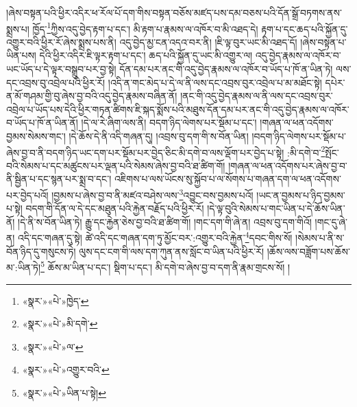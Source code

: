 །ཞེས་བསྟན་པའི་ཕྱིར་འདིར་ཕ་རོལ་པོ་དག་གིས་བསྟན་བཅོས་མཛད་པས་དམ་བཅས་པའི་དོན་སྒྲོ་བཏགས་ནས་སྨྲས་པ། ཁྱོད་\footnote{«སྣར་»«པེ་»ཁྱེད་}ཀྱིས་འདུ་བྱེད་རྟག་པ་དང་། མི་རྟག་པ་རྣམས་ལ་འཁོར་བ་མི་འཐད་དེ། རྟག་པ་དང་ཆད་པའི་སྐྱོན་དུ་འགྱུར་བའི་ཕྱིར་རོ་ཞེས་སྨྲས་པས་ནི། འདུ་བྱེད་མྱ་ངན་འདའ་བར་ནི། །ཇི་ལྟ་བུར་ཡང་མི་འཐད་དོ། །ཞེས་བསྟན་པ་ཡིན་པས། དེའི་ཕྱིར་འདིར་ཇི་ལྟར་རྟག་པ་དང་། ཆད་པའི་སྐྱོན་དུ་ཡང་མི་འགྱུར་ལ། འདུ་བྱེད་རྣམས་ལ་འཁོར་བ་ཡང་ཡོད་པ་དེ་ལྟར་བསྒྲུབ་པར་བྱ་སྟེ། དོན་དམ་པར་ནང་གི་འདུ་བྱེད་རྣམས་ལ་འཁོར་བ་ཡོད་པ་ཁོ་ན་ཡིན་ཏེ། ལས་དང་འབྲས་བུ་འབྲེལ་པའི་ཕྱིར་རོ། །འདི་ན་གང་མེད་པ་དེ་ལ་ནི་ལས་དང་འབྲས་བུར་འབྲེལ་པ་མ་མཐོང་སྟེ། དཔེར་ན་མོ་གཤམ་གྱི་བུ་ཞེས་བྱ་བའི་འདུ་བྱེད་རྣམས་བཞིན་ནོ། །ནང་གི་འདུ་བྱེད་རྣམས་ལ་ནི་ལས་དང་འབྲས་བུར་འབྲེལ་པ་ཡོད་པས་དེའི་ཕྱིར་གཏན་ཚིགས་ཇི་སྐད་སྨོས་པའི་མཐུས་དོན་དམ་པར་ནང་གི་འདུ་བྱེད་རྣམས་ལ་འཁོར་བ་ཡོད་པ་ཁོ་ན་ཡིན་ནོ། །དེ་ལ་རེ་ཞིག་ལས་ནི། བདག་ཉིད་ལེགས་པར་སྡོམ་པ་དང་། །གཞན་ལ་ཕན་འདོགས་བྱམས་སེམས་གང་། །དེ་ཆོས་དེ་ནི་འདི་གཞན་དུ། །འབྲས་བུ་དག་གི་ས་བོན་ཡིན། །བདག་ཉིད་ལེགས་པར་སྡོམ་པ་ཞེས་བྱ་བ་ནི་བདག་ཉིད་ཡང་དག་པར་སྡོམ་པར་བྱེད་ཅིང་མི་དགེ་བ་ལས་ལྡོག་པར་བྱེད་པ་སྟེ། :མི་དགེ་བ་\footnote{«སྣར་»«པེ་»མི་དགེ་}སྤོང་བའི་སེམས་པ་དང་མཚུངས་པར་ལྡན་པའི་སེམས་ཞེས་བྱ་བའི་ཐ་ཚིག་གོ། །གཞན་ལ་ཕན་འདོགས་པར་ཞེས་བྱ་བ་ནི་སྦྱིན་པ་དང་སྙན་པར་སྨྲ་བ་དང་། འཇིགས་པ་ལས་ཡོངས་སུ་སྐྱོབ་པ་ལ་སོགས་པ་གཞན་དག་ལ་ཕན་འདོགས་པར་བྱེད་པའོ། །བྱམས་པ་ཞེས་བྱ་བ་ནི་མཛའ་བཤེས་ལས་\footnote{«སྣར་»«པེ་»ལ་}འབྱུང་བས་བྱམས་པའོ། །ཡང་ན་བྱམས་པ་ཉིད་བྱམས་པ་སྟེ། བདག་གི་དོན་ལ་དེ་དང་མཐུན་པའི་རྐྱེན་བརྗོད་པའི་ཕྱིར་རོ། །དེ་ལྟ་བུའི་སེམས་པ་གང་ཡིན་པ་དེ་ཆོས་ཡིན་ནོ། །དེ་ནི་ས་བོན་ཡིན་ཏེ། རྒྱུ་དང་རྐྱེན་ཅེས་བྱ་བའི་ཐ་ཚིག་གོ། །གང་དག་གི་ཞེ་ན། འབྲས་བུ་དག་གིའོ། །གང་དུ་ཞེ་ན། འདི་དང་གཞན་དུ་སྟེ། ཚེ་འདི་དང་གཞན་དག་ཏུ་མྱོང་བར་:འགྱུར་བའི་རྐྱེན་\footnote{«སྣར་»«པེ་»འགྱུར་བའི་}དབང་གིས་སོ། །སེམས་པ་ནི་ས་བོན་ཉིད་དུ་གསུངས་ཏེ། ལུས་དང་ངག་གི་ལས་དག་ཀུན་ནས་སློང་བ་ཡིན་པའི་ཕྱིར་རོ། །ཆོས་ལས་བཟློག་པས་ཆོས་མ་:ཡིན་ཏེ།\footnote{«སྣར་»«པེ་»ཡིན་པ་སྟེ།} ཆོས་མ་ཡིན་པ་དང་། སྡིག་པ་དང་། མི་དགེ་བ་ཞེས་བྱ་བ་དག་ནི་རྣམ་གྲངས་སོ། །
